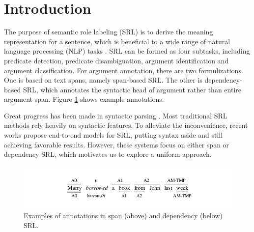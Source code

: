 \documentclass[letterpaper]{article} %
\begin{document}
\section{Introduction}
The purpose of semantic role labeling (SRL) is to derive the meaning representation for a sentence, which is beneficial to a wide range of natural language processing (NLP) tasks \cite{wang2016bilingual,zhang2018know}. SRL can be formed as four subtasks, including predicate detection, predicate disambiguation, argument identification and argument classification. For argument annotation, there are two formulizations. One is based on text spans, namely span-based SRL. The other is dependency-based SRL, which annotates the syntactic head of argument rather than entire argument span. Figure \ref{fig:example} shows example annotations.


Great progress has been made in syntactic parsing \cite{dozat2017deep,li2018seq2seq,li2018joint}. Most traditional SRL methods rely heavily on syntactic features. To alleviate the inconvenience, recent works \cite{zhou-xu2015,marcheggiani2017,he-acl2017,selfatt2018,he2018jointly,he:2018Syntax,cai2018full} propose end-to-end models for SRL, putting syntax aside and still achieving favorable results. However, these systems focus on either span or dependency SRL,
which motivates us to explore a uniform approach. 

\begin{figure}
	\centering
	\includegraphics[scale=1]{examples.pdf}
	\caption{\label{fig:example} Examples of annotations in span (above) and dependency (below) SRL.}
\end{figure}
\end{document}
